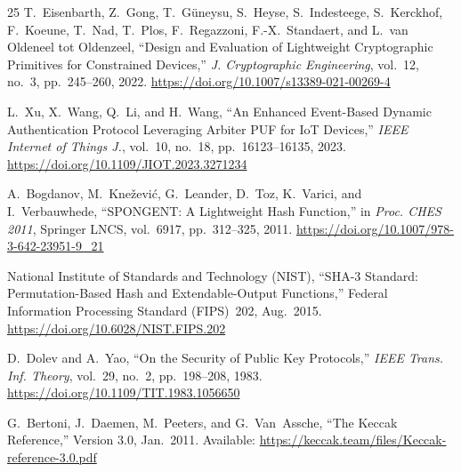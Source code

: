 \documentclass[11pt,a4paper]{article}
\begin{document}
\begin{thebibliography}{25}
T.~Eisenbarth, Z.~Gong, T.~G\"uneysu, S.~Heyse, S.~Indesteege, S.~Kerckhof, F.~Koeune, T.~Nad, T.~Plos, F.~Regazzoni, F.-X.~Standaert, and L.~van Oldeneel tot Oldenzeel, ``Design and Evaluation of Lightweight Cryptographic Primitives for Constrained Devices,'' \textit{J. Cryptographic Engineering}, vol.~12, no.~3, pp.~245--260, 2022. \url{https://doi.org/10.1007/s13389-021-00269-4}

L.~Xu, X.~Wang, Q.~Li, and H.~Wang, ``An Enhanced Event-Based Dynamic Authentication Protocol Leveraging Arbiter PUF for IoT Devices,'' \textit{IEEE Internet of Things J.}, vol.~10, no.~18, pp.~16123--16135, 2023. \url{https://doi.org/10.1109/JIOT.2023.3271234}

A.~Bogdanov, M.~Kne\v{z}evi\'c, G.~Leander, D.~Toz, K.~Varici, and I.~Verbauwhede, ``SPONGENT: A Lightweight Hash Function,'' in \textit{Proc. CHES 2011}, Springer LNCS, vol.~6917, pp.~312--325, 2011. \url{https://doi.org/10.1007/978-3-642-23951-9_21}

National Institute of Standards and Technology (NIST), ``SHA-3 Standard: Permutation-Based Hash and Extendable-Output Functions,'' Federal Information Processing Standard (FIPS)~202, Aug.~2015. \url{https://doi.org/10.6028/NIST.FIPS.202}

D.~Dolev and A.~Yao, ``On the Security of Public Key Protocols,'' \textit{IEEE Trans. Inf. Theory}, vol.~29, no.~2, pp.~198--208, 1983. \url{https://doi.org/10.1109/TIT.1983.1056650}

G.~Bertoni, J.~Daemen, M.~Peeters, and G.~Van~Assche, ``The Keccak Reference,'' Version 3.0, Jan.~2011. Available: \url{https://keccak.team/files/Keccak-reference-3.0.pdf}

\end{thebibliography}
\end{document}
